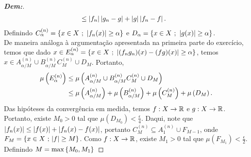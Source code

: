 \begin{proof}[\textbf{Dem:}]
\begin{align*}
  &\le\left|f_n\right|\left|g_n - g\right| + \left|g\right|\left|f_n - f\right|.
\end{align*}
  Definindo $C_\alpha^{(n)} = \left\{x \in X \text{ ; } \left|f_n(x)\right| \ge \alpha\right\}$ 
  e $D_\alpha = \left\{x \in X \text{ ; } \left|g(x)\right| \ge \alpha\right\}$.\\ 
De maneira análoga à argumentação apresentada na primeira parte do exercício, 
temos que dado $x \in E_{\alpha}^{(n)} = 
\left\{x \in X \text{ ; } \left|(f_ng_n)(x) -(fg)(x)\right|\ge \alpha\right\}$, 
  temos $x \in A_{\alpha/M}^{(n)}\cup B_{\alpha/M}^{(n)}
  C_{M}^{(n)}\cup D_{M}$. Portanto,
\begin{align*}
  \mu\left(E_\alpha^{(n)}\right) &\le \mu\left(A_{\alpha/M}^{(n)}\cup B_{\alpha/M}^{(n)}
  C_{M}^{(n)}\cup D_{M}\right)\\
&\le \mu\left(A_{\alpha/M}^{(n)}\right) + \mu\left(B_{\alpha/M}^{(n)}\right) 
+ \mu\left(C_{M}^{(n)}\right) + \mu\left(D_{M}\right).
\end{align*}
Das hipóteses da convergência em medida, temos $f:X \rightarrow \mathbb R$ e $g: X \rightarrow \mathbb R$. 
  Portanto, existe $M_0>0$ tal que $\mu(D_{M_0})<\frac{\epsilon}{4}$. 
  Daqui, note que $\left|f_n(x)\right| \le \left|f(x)\right| + \left|f_n(x) - f(x)\right|$, 
  portanto $C_{M}^{(n)} \subseteq A_{1}^{(n)} \cup F_{M-1}$, onde 
  $F_M = \left\{x\in X \text{ ; } |f| \ge M\right\}$. Como $f: X \rightarrow \mathbb R$, 
  existe $M_1 > 0$ tal que $\mu(F_{M_1}) < \frac{\epsilon}{2}$. Definindo 
  $M = \max\left\{M_0, M_1\right\}$
\end{proof}
